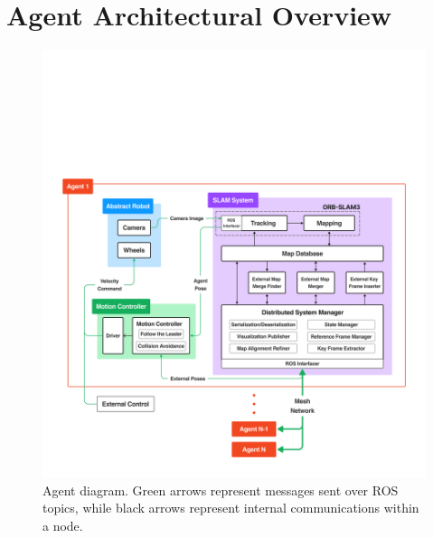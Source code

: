 






\label{sec:3}

\section{Agent Architectural Overview}
\label{sec:architectural-overview}

\begin{figure}[h]
    \centering
    \includegraphics[trim=5cm 5cm 5cm 30cm, scale=0.2]{figures/agent_diagram.pdf}
    \caption{Agent diagram. Green arrows represent messages sent over ROS topics, while black arrows represent internal communications within a node.}
    \label{fig:agent-diagram}
\end{figure}

